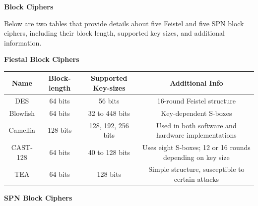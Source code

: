 \documentclass[10pt, a4paper]{article}
\newenvironment{Solution}{\textbf{Solution.}}
\begin{document}
\begin{Solution}

\begin{document}
\begin{center}
\textbf{Block Ciphers}
\end{center}

\noindent Below are two tables that provide details about five Feistel and five SPN block ciphers, including their block length, supported key sizes, and additional information.

\bigskip

\begin{center}
\textbf{Fiestal Block Ciphers}
\end{center}

\begin{table}[H]
\centering
\begin{tabular}{|c|c|c|c|}
\hline
\textbf{Name} & \textbf{Block-length} & \textbf{Supported Key-sizes} & \textbf{Additional Info} \\
\hline
DES        & 64 bits  & 56 bits              & 16-round Feistel structure                       \\
Blowfish   & 64 bits  & 32 to 448 bits       & Key-dependent S-boxes                            \\
Camellia   & 128 bits & 128, 192, 256 bits   & Used in both software and hardware implementations \\
CAST-128   & 64 bits  & 40 to 128 bits       & Uses eight S-boxes; 12 or 16 rounds depending on key size \\
TEA        & 64 bits  & 128 bits             & Simple structure, susceptible to certain attacks  \\
\hline
\end{tabular}
\end{table}

\bigskip

\begin{center}
\textbf{SPN Block Ciphers}
\end{center}


\end{document}
\end{Solution}
\end{document}
